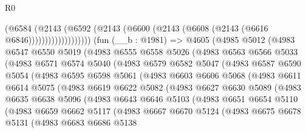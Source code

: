 \begin{lexlean}{R0}
\begin{coremodule}
                        (@6584
                          (@2143
                            (@6592
                              (@2143 (@6600 (@2143 (@6608 (@2143 (@6616 @6846)))))))))))))))))))
    (fun (__b : @1981) =>
    @4605
      (@4985
        @5012
        (@4983
          @6547
          @6550
          @5019
          (@4983
            @6555
            @6558
            @5026
            (@4983
              @6563
              @6566
              @5033
              (@4983
                @6571
                @6574
                @5040
                (@4983
                  @6579
                  @6582
                  @5047
                  (@4983
                    @6587
                    @6590
                    @5054
                    (@4983
                      @6595
                      @6598
                      @5061
                      (@4983
                        @6603
                        @6606
                        @5068
                        (@4983
                          @6611
                          @6614
                          @5075
                          (@4983
                            @6619
                            @6622
                            @5082
                            (@4983
                              @6627
                              @6630
                              @5089
                              (@4983
                                @6635
                                @6638
                                @5096
                                (@4983
                                  @6643
                                  @6646
                                  @5103
                                  (@4983
                                    @6651
                                    @6654
                                    @5110
                                    (@4983
                                      @6659
                                      @6662
                                      @5117
                                      (@4983
                                        @6667
                                        @6670
                                        @5124
                                        (@4983
                                          @6675
                                          @6678
                                          @5131
                                          (@4983
                                            @6683
                                            @6686
                                            @5138

\end{coremodule}
\end{lexlean}
